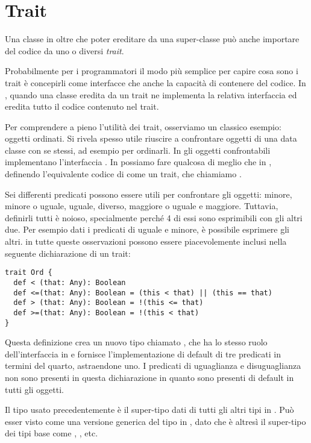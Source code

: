 \section{Trait}
\label{sec:traits}

Una classe in \Scala oltre che poter ereditare da una super-classe pu\`o anche importare del codice da uno o diversi \emph{trait}.

Probabilmente per i programmatori \Java il modo pi\`u semplice per capire cosa sono i trait \`e concepirli come interfacce che anche la capacit\`a di contenere del codice. In \Scala, quando una classe eredita da un trait ne implementa la relativa interfaccia ed eredita tutto il codice contenuto nel trait.

Per comprendere a pieno l'utilit\`a  dei trait, osserviamo un classico esempio:
oggetti ordinati. Si rivela spesso utile riuscire a confrontare oggetti di una data classe con se stessi, ad esempio per ordinarli. In \Java gli oggetti confrontabili implementano l'interfaccia . In \Scala possiamo fare qualcosa di meglio che in \Java, definendo l'equivalente codice di  come un trait, che chiamiamo .

Sei differenti predicati possono essere utili per confrontare gli oggetti: minore, minore o uguale, uguale, diverso, maggiore o uguale e maggiore. Tuttavia, definirli tutti \`e noioso, specialmente perch\'e 4 di essi sono esprimibili con gli altri due. Per esempio dati i predicati di uguale e minore, \`e possibile esprimere gli altri. in \Scala tutte queste osservazioni possono essere piacevolemente inclusi nella seguente \newline dichiarazione di un trait:
\begin{lstlisting}
trait Ord {
  def < (that: Any): Boolean
  def <=(that: Any): Boolean = (this < that) || (this == that)
  def > (that: Any): Boolean = !(this <= that)
  def >=(that: Any): Boolean = !(this < that)
} 
\end{lstlisting}
Questa definizione crea un nuovo tipo chiamato , che ha lo stesso ruolo dell'interfaccia  in \Java e fornisce l'implementazione di default di tre predicati in termini del quarto, astraendone uno. I predicati di uguaglianza e disuguaglianza non sono presenti in questa dichiarazione in quanto sono presenti di default in tutti gli oggetti.

Il tipo  usato precedentemente \`e il super-tipo dati di tutti gli altri tipi in \Scala. Pu\`o esser visto come una versione generica del tipo  in \Java, dato che \`e altres\`i il super-tipo dei tipi base come , , etc.

